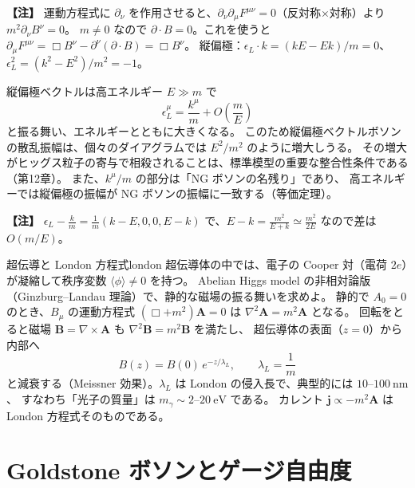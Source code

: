 \documentclass[uplatex,dvipdfmx,a4paper,11pt,openany]{jsbook}
\newenvironment{note}{\vspace{1ex}\par\footnotesize\noindent\textbf{【注】}}{\par\vspace{1ex}}
\numberwithin{equation}{chapter}
\theoremstyle{definition}
\theoremstyle{plain}
\theoremstyle{remark}
\begin{document}
\begin{note}
運動方程式に $\partial_\nu$ を作用させると、$\partial_\nu\partial_\mu F^{\mu\nu}=0$（反対称×対称）より $m^2\partial_\nu B^\nu=0$。
$m\ne0$ なので $\partial\cdot B=0$。これを使うと $\partial_\mu F^{\mu\nu}=\Box B^\nu-\partial^\nu(\partial\cdot B)=\Box B^\nu$。
縦偏極：$\epsilon_L\cdot k=(kE-Ek)/m=0$、$\epsilon_L^2=(k^2-E^2)/m^2=-1$。
\end{note}
縦偏極ベクトルは高エネルギー $E\gg m$ で
\begin{equation}
\epsilon^\mu_L=\frac{k^\mu}{m}+O\!\left(\frac mE\right)
\label{eq:epsL-highE}
\end{equation}
と振る舞い、エネルギーとともに大きくなる。
このため縦偏極ベクトルボソンの散乱振幅は、個々のダイアグラムでは $E^2/m^2$ のように増大しうる。
その増大がヒッグス粒子の寄与で相殺されることは、標準模型の重要な整合性条件である（第12章）。
また、$k^\mu/m$ の部分は「NG ボソンの名残り」であり、
高エネルギーでは縦偏極の振幅が NG ボソンの振幅に一致する（等価定理）。
\begin{note}
$\epsilon_L-\frac km=\frac1m(k-E,0,0,E-k)$ で、$E-k=\frac{m^2}{E+k}\simeq\frac{m^2}{2E}$ なので差は $O(m/E)$。
\end{note}
\begin{myex}{超伝導と London 方程式}{london}
超伝導体の中では、電子の Cooper 対（電荷 $2e$）が凝縮して秩序変数 $\langle\phi\rangle\ne0$ を持つ。
Abelian Higgs model の非相対論版（Ginzburg--Landau 理論）で、静的な磁場の振る舞いを求めよ。
\tcblower
静的で $A_0=0$ のとき、$B_\mu$ の運動方程式 $(\Box+m^2)\bm A=0$ は $\nabla^2\bm A=m^2\bm A$ となる。
回転をとると磁場 $\bm B=\nabla\times\bm A$ も $\nabla^2\bm B=m^2\bm B$ を満たし、
超伝導体の表面（$z=0$）から内部へ
\[
B(z)=B(0)\,e^{-z/\lambda_L},\qquad \lambda_L=\frac1m
\]
と減衰する（Meissner 効果）。$\lambda_L$ は London の侵入長で、典型的には $10$--$100\ \mathrm{nm}$、
すなわち「光子の質量」は $m_\gamma\sim2$--$20\ \mathrm{eV}$ である。
カレント $\bm j\propto-m^2\bm A$ は London 方程式そのものである。
\end{myex}
\section{Goldstone ボソンとゲージ自由度}
\label{sec:NG-gauge-dof}
\end{document}
